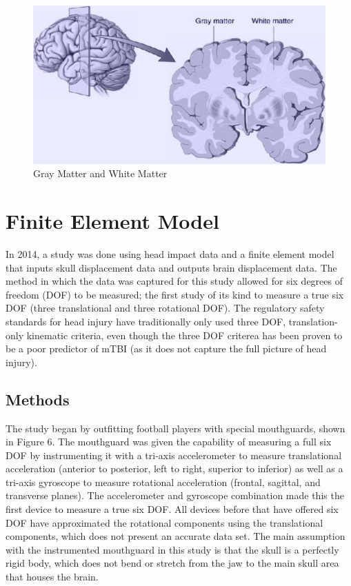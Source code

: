 \documentclass[%
 aip,
 amsmath,amssymb,
 reprint,%
 floatfix,%
]{revtex4-1}
\begin{document}
\begin{figure}
	\centering
	\includegraphics[scale=1.7]{brainmatter.jpg}
	\caption{Gray Matter and White Matter}
\end{figure}

\section{\label{sec:level3}Finite Element Model}

In 2014, a study was done using head impact data and a finite element model that inputs skull displacement data and outputs brain displacement data. The method in which the data was captured for this study allowed for six degrees of freedom (DOF) to be measured; the first study of its kind to measure a true six DOF (three translational and three rotational DOF). The regulatory safety standards for head injury have traditionally only used three DOF, translation-only kinematic criteria\cite{Hernandez2014}, even though the three DOF criterea has been proven to be a poor predictor of mTBI (as it does not capture the full picture of head injury).

\subsection{Methods}

The study began by outfitting football players with special mouthguards, shown in Figure 6. The mouthguard was given the capability of measuring a full six DOF by instrumenting it with a tri-axis accelerometer to measure translational acceleration (anterior to posterior, left to right, superior to inferior) as well as a tri-axis gyroscope to measure rotational acceleration (frontal, sagittal, and transverse planes). The accelerometer and gyroscope combination made this the first device to measure a true six DOF. All devices before that have offered six DOF have approximated the rotational components using the translational components, which does not present an accurate data set. The main assumption with the instrumented mouthguard in this study is that the skull is a perfectly rigid body, which does not bend or stretch from the jaw to the main skull area that houses the brain.
\end{document}
